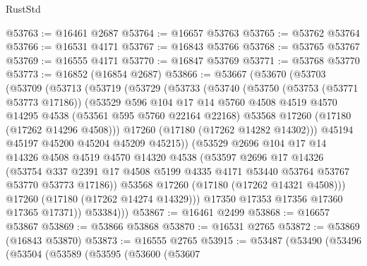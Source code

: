 \begin{lexlean}{RustStd}
\begin{coremodule}
{\begin{coremodule}
{{{{{{{{{{{{{{{{{{{{{{{{{{{{{{{{{{{{{{{{{{{{{{{{{{{{{{{@53763 := @16461 @2687
@53764 := @16657 @53763
@53765 := @53762 @53764
@53766 := @16531 @4171
@53767 := @16843 @53766
@53768 := @53765 @53767
@53769 := @16555 @4171
@53770 := @16847 @53769
@53771 := @53768 @53770
@53773 := @16852 (@16854 @2687)
@53866 := @53667
    (@53670
      (@53703
        (@53709
          (@53713
            (@53719
              (@53729
                (@53733
                  (@53740
                    (@53750
                      (@53753 (@53771 @53773 @17186))
                      (@53529
                        @596
                        @104
                        @17
                        @14
                        @5760
                        @4508
                        @4519
                        @4570
                        @14295
                        @4538
                        (@53561 @595 @5760 @22164 @22168)
                        @53568
                        @17260
                        (@17180 (@17262 @14296 @4508)))
                      @17260
                      (@17180 (@17262 @14282 @14302)))
                    @45194
                    @45197
                    @45200
                    @45204
                    @45209
                    @45215))
                (@53529
                  @2696
                  @104
                  @17
                  @14
                  @14326
                  @4508
                  @4519
                  @4570
                  @14320
                  @4538
                  (@53597
                    @2696
                    @17
                    @14326
                    (@53754
                      @337
                      @2391
                      @17
                      @4508
                      @5199
                      @4335
                      @4171
                      @53440
                      @53764
                      @53767
                      @53770
                      @53773
                      @17186))
                  @53568
                  @17260
                  (@17180 (@17262 @14321 @4508)))
                @17260
                (@17180 (@17262 @14274 @14329)))
              @17350
              @17353
              @17356
              @17360
              @17365
              @17371))
          @53384)))
@53867 := @16461 @2499
@53868 := @16657 @53867
@53869 := @53866 @53868
@53870 := @16531 @2765
@53872 := @53869 (@16843 @53870)
@53873 := @16555 @2765
@53915 := @53487
    (@53490
      (@53496
        (@53504
          (@53589
            (@53595
              (@53600
                (@53607
}}}}}}}}}}}}}}}}}}}}}}}}}}}}}}}}}}}}}}}}}}}}}}}}}}}}}}}
\end{coremodule}}
\end{coremodule}
\end{lexlean}
